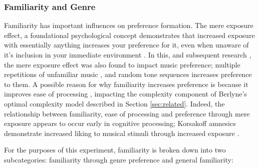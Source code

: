 \subsubsection{Familiarity and Genre}
Familiarity has important influences on preference formation. The mere exposure effect, a foundational psychological concept \cite{meyer1903experimental,zajonc1968attitudinal} demonstrates that increased exposure with essentially anything increases your preference for it, even when unaware of it's inclusion in your immediate environment \cite{mandler1987nonspecific}. In this, and subsequent research \cite{peretz1998exposure}, the mere exposure effect was also found to impact music preference; multiple repetitions of unfamiliar music \cite{meyer1903experimental}, and random tone sequences \cite{wilson1979feeling} increases preference to them. A possible reason for why familiarity increases preference is because it improves ease of processing \cite{novemsky2007preference}, impacting the complexity component of Berlyne's optimal complexity model described in Section \ref{sec:related}. Indeed, the relationship between familiarity, ease of processing and preference through mere exposure appears to occur early in cognitive processing; Korsakoff amnesics demonstrate increased liking to musical stimuli through increased exposure \cite{johnson1985alcoholic}.

For the purposes of this experiment, familiarity is broken down into two subcategories: familiarity through genre preference and general familiarity:

